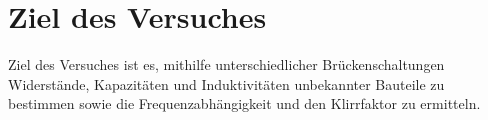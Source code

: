 \section{Ziel des Versuches}
\label{sec:versuchsziel}

Ziel des Versuches ist es, mithilfe unterschiedlicher Brückenschaltungen Widerstände, Kapazitäten und Induktivitäten unbekannter Bauteile zu bestimmen sowie die Frequenzabhängigkeit und den Klirrfaktor zu ermitteln.